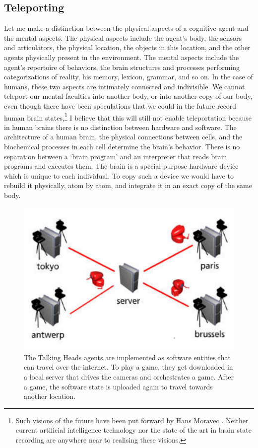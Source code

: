 \subsection{Teleporting}

Let me make a distinction between the physical aspects of 
a cognitive agent and the mental aspects. The physical aspects include the 
agent's body, the sensors and articulators, 
the physical location, the objects in this location, and the other
agents physically present in the environment. The 
mental aspects include the agent's repertoire of behaviors, 
the brain structures and processes
performing categorizations of reality, his
memory, lexicon, grammar, and so on. 
In the case of humans, these two aspects are intimately 
connected and indivisible. We cannot teleport our mental 
faculties into another body, or into another copy of 
our body, even though there have been speculations that 
we could in the future record human 
brain states,\footnote{
Such visions of the future have been put forward
by Hans Moravec \cite{Moravec:1995}. Neither current artificial intelligence technology nor
the state of the art in brain state recording are anywhere 
near to realising these visions.}
I believe that this will still not enable teleportation
because in human brains there is no distinction between 
hardware and software. The architecture of a human brain, 
the physical connections between cells, and the 
biochemical processes in each cell determine the brain's behavior.
There is no separation between a `brain program' and
an interpreter that reads brain programs and 
executes them. The brain is a special-purpose 
hardware device which is unique to each individual. 
To copy such a device we would have to rebuild it physically,
atom by atom, and integrate it in an exact copy of the 
same body. 

\begin{figure}[htbp]
  \centerline{\includegraphics[width=.50\textwidth]{chap1/figs/teleportation}}
\caption{\small The Talking Heads agents are implemented as software entities that can travel over the internet. 
To play a game, they get downloaded in a local server that drives the cameras and orchestrates a game. After a game, the software 
state is uploaded again to travel towards another location.}
\label{f:teleport}
\end{figure}

